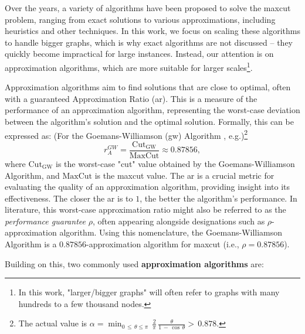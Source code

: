 
Over the years, a variety of algorithms have been proposed to solve the \acrshort{maxcut} problem, ranging from exact solutions to various approximations, including heuristics and other techniques. In this work, we focus on scaling these algorithms to handle bigger graphs, which is why exact algorithms are not discussed – they quickly become impractical for large instances. Instead, our attention is on approximation algorithms, which are more suitable for larger scales\footnote{In this work, "larger/bigger graphs" will often refer to graphs with many hundreds to a few thousand nodes.}.

Approximation algorithms aim to find solutions that are close to optimal, often with a guaranteed Approximation Ratio (\acrshort{ar}). This is a measure of the performance of an approximation algorithm, representing the worst-case deviation between the algorithm's solution and the optimal solution. Formally, this can be expressed as: (For the Goemans-Williamson (\acrshort{gw}) Algorithm \cite{GW-Algorithm}, e.g.)\footnote{The actual value is $\alpha=\operatorname*{min}_{0\,\leq\,\theta\leq\pi}\,\frac{2}{\pi}\,\frac{\theta}{1\,-\,\cos\,\theta} > \,0.878$.}$$r_A^{GW} = \frac{\text{Cut}_{\text{GW}}}{\text{MaxCut}} \approx 0.87856,$$
where $\text{Cut}_{\text{GW}}$ is the worst-case "cut" value obtained by the Goemans-Williamson Algorithm, and $\text{MaxCut}$ is the \acrshort{maxcut} value. The \acrshort{ar} is a crucial metric for evaluating the quality of an approximation algorithm, providing insight into its effectiveness. The closer the \acrshort{ar} is to $1$, the better the algorithm's performance. In literature, this worst-case approximation ratio might also be referred to as the \textit{performance guarantee} $\rho$, often appearing alongside designations such as $\rho$-approximation algorithm. Using this nomenclature, the Goemans-Williamson Algorithm is a $0.87856$-approximation algorithm for \acrshort{maxcut} (i.e., $\rho = 0.87856$).

Building on this, two commonly used \textbf{approximation algorithms} are:

